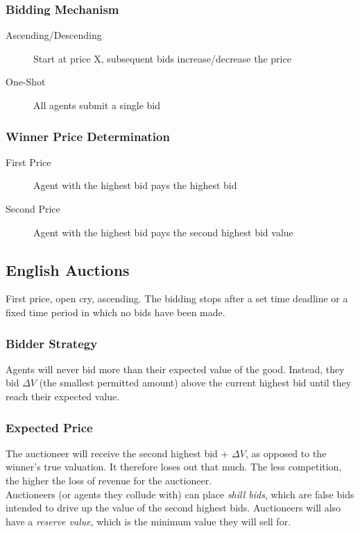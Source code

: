 \subsubsection{Bidding Mechanism}
\begin{description}
    \item[Ascending/Descending] Start at price X, subsequent bids increase/decrease the price
    \item[One-Shot] All agents submit a single bid
\end{description}

\subsubsection{Winner Price Determination}
\begin{description}
    \item[First Price] Agent with the highest bid pays the highest bid
    \item[Second Price] Agent with the highest bid pays the second highest bid value
\end{description}

\subsection{English Auctions}
First price, open cry, ascending. The bidding stops after a set time deadline or a fixed time period in which no bids have been made. 

\subsubsection{Bidder Strategy}
Agents will never bid more than their expected value of the good. Instead, they bid $\Delta V$ (the smallest permitted amount) above the current highest bid until they reach their expected value.

\subsubsection{Expected Price}
The auctioneer will receive the second highest bid + $\Delta V$, as opposed to the winner's true valuation. It therefore loses out that much. The less competition, the higher the loss of revenue for the auctioneer.\\
Auctioneers (or agents they collude with) can place \emph{shill bids}, which are false bids intended to drive up the value of the second highest bids. Auctioneers will also have a \emph{reserve value}, which is the minimum value they will sell for. 

